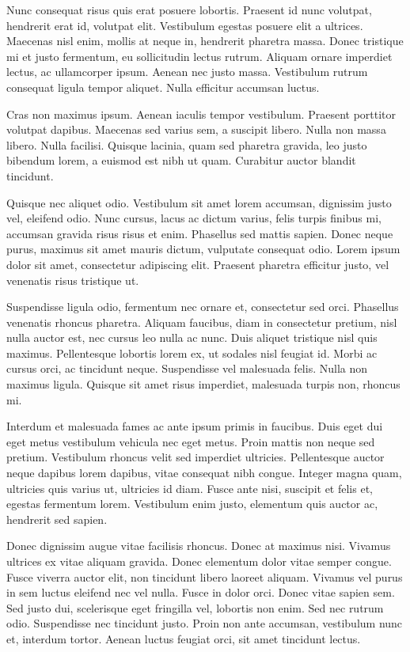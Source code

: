 Nunc consequat risus quis erat posuere lobortis. Praesent id nunc volutpat, hendrerit erat id, volutpat elit. Vestibulum egestas posuere elit a ultrices. Maecenas nisl enim, mollis at neque in, hendrerit pharetra massa. Donec tristique mi et justo fermentum, eu sollicitudin lectus rutrum. Aliquam ornare imperdiet lectus, ac ullamcorper ipsum. Aenean nec justo massa. Vestibulum rutrum consequat ligula tempor aliquet. Nulla efficitur accumsan luctus.

Cras non maximus ipsum. Aenean iaculis tempor vestibulum. Praesent porttitor volutpat dapibus. Maecenas sed varius sem, a suscipit libero. Nulla non massa libero. Nulla facilisi. Quisque lacinia, quam sed pharetra gravida, leo justo bibendum lorem, a euismod est nibh ut quam. Curabitur auctor blandit tincidunt.

Quisque nec aliquet odio. Vestibulum sit amet lorem accumsan, dignissim justo vel, eleifend odio. Nunc cursus, lacus ac dictum varius, felis turpis finibus mi, accumsan gravida risus risus et enim. Phasellus sed mattis sapien. Donec neque purus, maximus sit amet mauris dictum, vulputate consequat odio. Lorem ipsum dolor sit amet, consectetur adipiscing elit. Praesent pharetra efficitur justo, vel venenatis risus tristique ut.

Suspendisse ligula odio, fermentum nec ornare et, consectetur sed orci. Phasellus venenatis rhoncus pharetra. Aliquam faucibus, diam in consectetur pretium, nisl nulla auctor est, nec cursus leo nulla ac nunc. Duis aliquet tristique nisl quis maximus. Pellentesque lobortis lorem ex, ut sodales nisl feugiat id. Morbi ac cursus orci, ac tincidunt neque. Suspendisse vel malesuada felis. Nulla non maximus ligula. Quisque sit amet risus imperdiet, malesuada turpis non, rhoncus mi.

Interdum et malesuada fames ac ante ipsum primis in faucibus. Duis eget dui eget metus vestibulum vehicula nec eget metus. Proin mattis non neque sed pretium. Vestibulum rhoncus velit sed imperdiet ultricies. Pellentesque auctor neque dapibus lorem dapibus, vitae consequat nibh congue. Integer magna quam, ultricies quis varius ut, ultricies id diam. Fusce ante nisi, suscipit et felis et, egestas fermentum lorem. Vestibulum enim justo, elementum quis auctor ac, hendrerit sed sapien.

Donec dignissim augue vitae facilisis rhoncus. Donec at maximus nisi. Vivamus ultrices ex vitae aliquam gravida. Donec elementum dolor vitae semper congue. Fusce viverra auctor elit, non tincidunt libero laoreet aliquam. Vivamus vel purus in sem luctus eleifend nec vel nulla. Fusce in dolor orci. Donec vitae sapien sem. Sed justo dui, scelerisque eget fringilla vel, lobortis non enim. Sed nec rutrum odio. Suspendisse nec tincidunt justo. Proin non ante accumsan, vestibulum nunc et, interdum tortor. Aenean luctus feugiat orci, sit amet tincidunt lectus.

